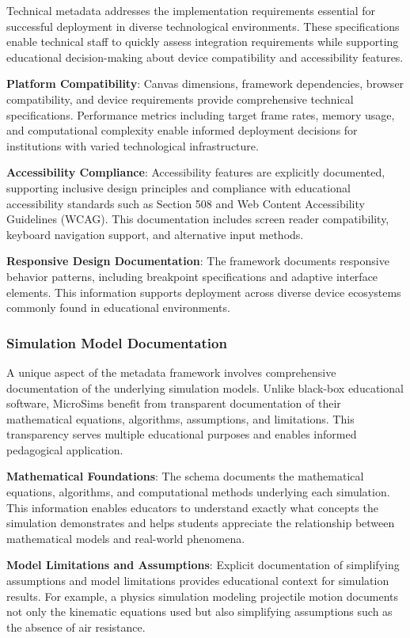Technical metadata addresses the implementation requirements essential for successful deployment in diverse technological environments. These specifications enable technical staff to quickly assess integration requirements while supporting educational decision-making about device compatibility and accessibility features.

\textbf{Platform Compatibility}: Canvas dimensions, framework dependencies, browser compatibility, and device requirements provide comprehensive technical specifications. Performance metrics including target frame rates, memory usage, and computational complexity enable informed deployment decisions for institutions with varied technological infrastructure.

\textbf{Accessibility Compliance}: Accessibility features are explicitly documented, supporting inclusive design principles and compliance with educational accessibility standards such as Section 508 and Web Content Accessibility Guidelines (WCAG). This documentation includes screen reader compatibility, keyboard navigation support, and alternative input methods.

\textbf{Responsive Design Documentation}: The framework documents responsive behavior patterns, including breakpoint specifications and adaptive interface elements. This information supports deployment across diverse device ecosystems commonly found in educational environments.

\subsubsection{Simulation Model Documentation}

A unique aspect of the metadata framework involves comprehensive documentation of the underlying simulation models. Unlike black-box educational software, MicroSims benefit from transparent documentation of their mathematical equations, algorithms, assumptions, and limitations. This transparency serves multiple educational purposes and enables informed pedagogical application.

\textbf{Mathematical Foundations}: The schema documents the mathematical equations, algorithms, and computational methods underlying each simulation. This information enables educators to understand exactly what concepts the simulation demonstrates and helps students appreciate the relationship between mathematical models and real-world phenomena.

\textbf{Model Limitations and Assumptions}: Explicit documentation of simplifying assumptions and model limitations provides educational context for simulation results. For example, a physics simulation modeling projectile motion documents not only the kinematic equations used but also simplifying assumptions such as the absence of air resistance.

